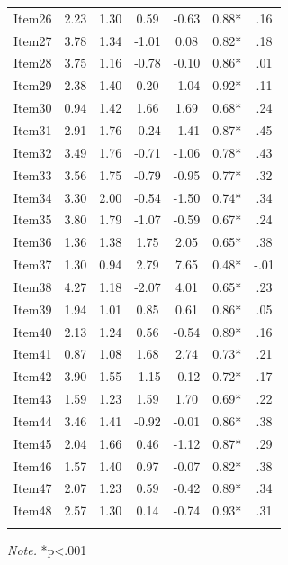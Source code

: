 \begin{appendix}
\begin{table}[h]
\begin{center}
\begin{threeparttable}
\begin{tabular}{ccccccc}
Item26 & 2.23 & 1.30 & 0.59 & -0.63 & 0.88* & .16\\
Item27 & 3.78 & 1.34 & -1.01 & 0.08 & 0.82* & .18\\
Item28 & 3.75 & 1.16 & -0.78 & -0.10 & 0.86* & .01\\
Item29 & 2.38 & 1.40 & 0.20 & -1.04 & 0.92* & .11\\
Item30 & 0.94 & 1.42 & 1.66 & 1.69 & 0.68* & .24\\
Item31 & 2.91 & 1.76 & -0.24 & -1.41 & 0.87* & .45\\
Item32 & 3.49 & 1.76 & -0.71 & -1.06 & 0.78* & .43\\
Item33 & 3.56 & 1.75 & -0.79 & -0.95 & 0.77* & .32\\
Item34 & 3.30 & 2.00 & -0.54 & -1.50 & 0.74* & .34\\
Item35 & 3.80 & 1.79 & -1.07 & -0.59 & 0.67* & .24\\
Item36 & 1.36 & 1.38 & 1.75 & 2.05 & 0.65* & .38\\
Item37 & 1.30 & 0.94 & 2.79 & 7.65 & 0.48* & -.01\\
Item38 & 4.27 & 1.18 & -2.07 & 4.01 & 0.65* & .23\\
Item39 & 1.94 & 1.01 & 0.85 & 0.61 & 0.86* & .05\\
Item40 & 2.13 & 1.24 & 0.56 & -0.54 & 0.89* & .16\\
Item41 & 0.87 & 1.08 & 1.68 & 2.74 & 0.73* & .21\\
Item42 & 3.90 & 1.55 & -1.15 & -0.12 & 0.72* & .17\\
Item43 & 1.59 & 1.23 & 1.59 & 1.70 & 0.69* & .22\\
Item44 & 3.46 & 1.41 & -0.92 & -0.01 & 0.86* & .38\\
Item45 & 2.04 & 1.66 & 0.46 & -1.12 & 0.87* & .29\\
Item46 & 1.57 & 1.40 & 0.97 & -0.07 & 0.82* & .38\\
Item47 & 2.07 & 1.23 & 0.59 & -0.42 & 0.89* & .34\\
Item48 & 2.57 & 1.30 & 0.14 & -0.74 & 0.93* & .31\\
\bottomrule
\addlinespace
\end{tabular}

\begin{tablenotes}[para]
\normalsize{\textit{Note.} *p<.001}
\end{tablenotes}

\end{threeparttable}
\end{center}

\end{table}


\end{appendix}
